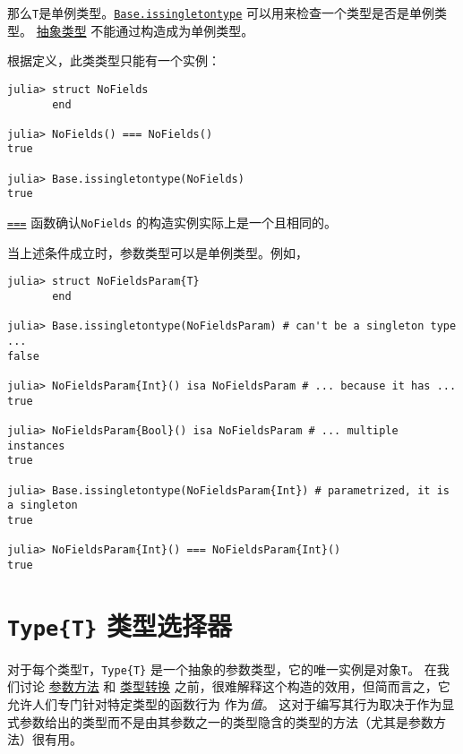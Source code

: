 那么\texttt{T}是单例类型。\footnotemark[2] \hyperlink{1553131089235872077}{\texttt{Base.issingletontype}} 可以用来检查一个类型是否是单例类型。 \hyperlink{1549354324836889217}{抽象类型} 不能通过构造成为单例类型。



根据定义，此类类型只能有一个实例：




\begin{verbatim}
julia> struct NoFields
       end

julia> NoFields() === NoFields()
true

julia> Base.issingletontype(NoFields)
true
\end{verbatim}



\hyperlink{7974744969331231272}{\texttt{===}} 函数确认\texttt{NoFields} 的构造实例实际上是一个且相同的。



当上述条件成立时，参数类型可以是单例类型。例如，




\begin{verbatim}
julia> struct NoFieldsParam{T}
       end

julia> Base.issingletontype(NoFieldsParam) # can't be a singleton type ...
false

julia> NoFieldsParam{Int}() isa NoFieldsParam # ... because it has ...
true

julia> NoFieldsParam{Bool}() isa NoFieldsParam # ... multiple instances
true

julia> Base.issingletontype(NoFieldsParam{Int}) # parametrized, it is a singleton
true

julia> NoFieldsParam{Int}() === NoFieldsParam{Int}()
true
\end{verbatim}



\hypertarget{17554473119913222331}{}


\section{\texttt{Type\{T\}} 类型选择器}



对于每个类型\texttt{T}，\texttt{Type\{T\}} 是一个抽象的参数类型，它的唯一实例是对象\texttt{T}。 在我们讨论 \hyperlink{5820282638415739482}{参数方法} 和 \hyperlink{10374023657104680331}{类型转换} 之前，很难解释这个构造的效用，但简而言之，它允许人们专门针对特定类型的函数行为 作为\emph{值}。 这对于编写其行为取决于作为显式参数给出的类型而不是由其参数之一的类型隐含的类型的方法（尤其是参数方法）很有用。



